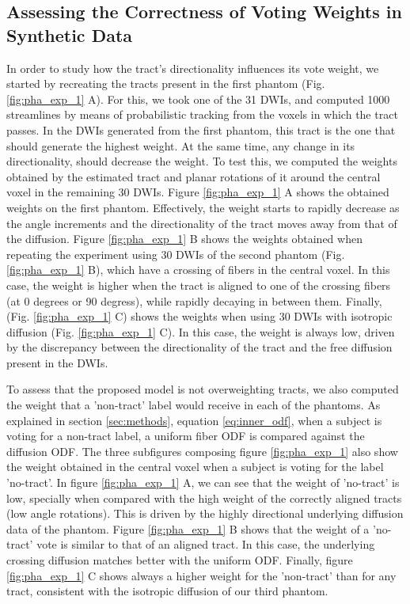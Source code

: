 \subsection{Assessing the Correctness of Voting Weights in Synthetic Data}
In order to study how the tract's directionality influences its vote weight,
we started by recreating the tracts present in the first phantom (Fig. \ref{fig:pha_exp_1} A).
For this, we took one of the 31 DWIs, and computed 1000 streamlines by means of 
probabilistic tracking from the voxels in which the tract passes. In the DWIs
generated from the first phantom, this tract is the one that should generate the
highest weight. At the same time, any change in its directionality, should decrease
the weight. To test this, we computed the weights obtained by the estimated tract
and planar rotations of it around the central voxel in the remaining 30 DWIs.
Figure \ref{fig:pha_exp_1} A shows the obtained weights on the first phantom.
Effectively, the weight starts to rapidly decrease as the angle increments and 
the directionality of the tract moves away from that of the diffusion.
Figure \ref{fig:pha_exp_1} B shows the weights obtained when repeating the 
experiment using 30 DWIs of the second phantom (Fig. \ref{fig:pha_exp_1} B),
which have a crossing of fibers in the central voxel. In this case, the weight
is higher when the tract is aligned to one of the crossing fibers (at 0 degrees
or 90 degress), while rapidly decaying in between them. Finally,
(Fig. \ref{fig:pha_exp_1} C) shows the weights when using 30 DWIs with
isotropic diffusion (Fig. \ref{fig:pha_exp_1} C). In this case, the weight
is always low, driven by the discrepancy between the directionality of the tract
and the free diffusion present in the DWIs.

To assess that the proposed model is not overweighting tracts, we also computed
the weight that a 'non-tract' label would receive in each of the phantoms. As
explained in section \ref{sec:methods}, equation \ref{eq:inner_odf}, when a
subject is voting for a non-tract label, a uniform fiber ODF is compared against
the diffusion ODF. The three subfigures composing figure \ref{fig:pha_exp_1}
also show the weight obtained in the central voxel when a subject is voting for
the label 'no-tract'. In figure \ref{fig:pha_exp_1} A, we can see that the
weight of 'no-tract' is low, specially when compared with the high weight
of the correctly aligned tracts (low angle rotations). This is driven by the
highly directional underlying diffusion data of the phantom. 
Figure \ref{fig:pha_exp_1} B shows that the weight of a 'no-tract' vote is
similar to that of an aligned tract. In this case, the underlying crossing
diffusion matches better with the uniform ODF. Finally, figure \ref{fig:pha_exp_1} C
shows always a higher weight for the 'non-tract' than for any tract, consistent
with the isotropic diffusion of our third phantom.


